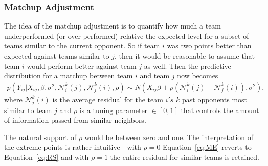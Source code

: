 \subsubsection{Matchup Adjustment}
The idea of the matchup adjustment is to quantify how much a team underperformed (or over performed) relative the expected level for a subset of teams similar to the current opponent.  So if team $i$ was two points better than expected against teams similar to $j$, then it would be reasonable to assume that team $i$ would perform better against team $j$ as well.  Then the predictive distribution for a matchup between team $i$ and team $j$ now becomes
\begin{eqnarray}
p(Y_{ij}|X_{ij}, \beta,\sigma^2,\mathcal{N}_i^k(j),\mathcal{N}_j^k(i), \rho) \sim N(X_{ij} \beta + \rho(\mathcal{N}_i^k(j) -\mathcal{N}_j^k(i)), \sigma^2),
\label{eq:ME}
\end{eqnarray}
where $\mathcal{N}_j^k(i)$ is the average residual for the team $i's$ $k$ past opponents most similar to team $j$ and $\rho$ is a tuning parameter $\in [0,1]$ that controls the amount of information passed from similar neighbors. 

The natural support of $\rho$ would be between zero and one.  The interpretation of the extreme points is rather intuitive - with $\rho = 0$ Equation~\ref{eq:ME} reverts to Equation~\ref{eq:RS} and with $\rho = 1$ the entire residual for similar teams is retained. 